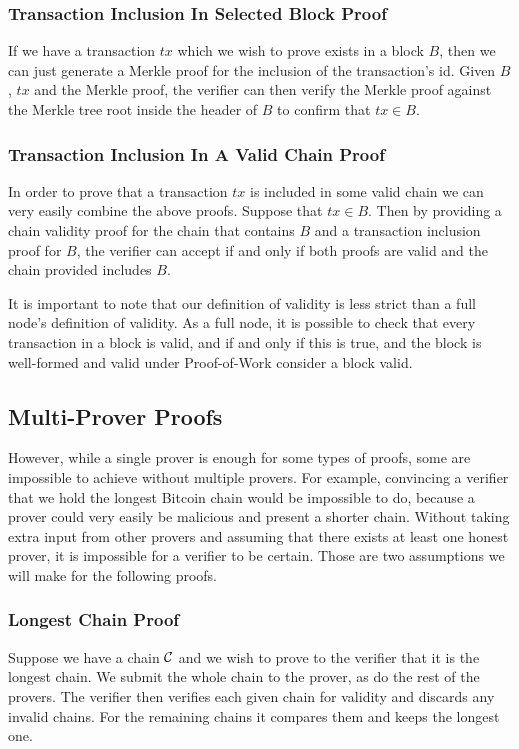 \subsubsection{Transaction Inclusion In Selected Block Proof}
If we have a transaction $tx$ which we wish to prove exists in a block $B$, then we can just generate a Merkle proof for the inclusion of the transaction's id. Given $B$, $tx$ and the Merkle proof, the verifier can then verify the Merkle proof against the Merkle tree root inside the header of $B$ to confirm that $tx \in B$.

\subsubsection{Transaction Inclusion In A Valid Chain Proof}
In order to prove that a transaction $tx$ is included in some valid chain we can very easily combine the above proofs. Suppose that $tx \in B$. Then by providing a chain validity proof for the chain that contains $B$ and a transaction inclusion proof for $B$, the verifier can accept if and only if both proofs are valid and the chain provided includes $B$.

It is important to note that our definition of validity is less strict than a full node's definition of validity. As a full node, it is possible to check that every transaction in a block is valid, and if and only if this is true, and the block is well-formed and valid under Proof-of-Work consider a block valid. 


\subsection{Multi-Prover Proofs}
However, while a single prover is enough for some types of proofs, some are impossible to achieve without multiple provers. For example, convincing a verifier that we hold the longest Bitcoin chain would be impossible to do, because a prover could very easily be malicious and present a shorter chain. Without taking extra input from other provers and assuming that there exists at least one honest prover, it is impossible for a verifier to be certain. Those are two assumptions we will make for the following proofs.

\subsubsection{Longest Chain Proof}
Suppose we have a chain $\mathcal{C}$ and we wish to prove to the verifier that it is the longest chain. We submit the whole chain to the prover, as do the rest of the provers. The verifier then verifies each given chain for validity and discards any invalid chains. For the remaining chains it compares them and keeps the longest one.

